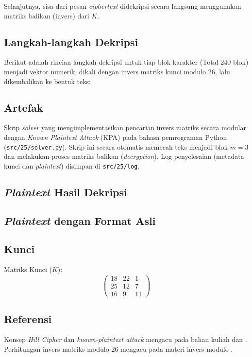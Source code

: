 Selanjutnya, sisa dari pesan \textit{ciphertext} didekripsi secara langsung menggunakan matriks balikan (invers) dari $K$.

\subsection*{Langkah-langkah Dekripsi}

Berikut adalah rincian langkah dekripsi untuk tiap blok karakter (Total 240 blok) menjadi vektor numerik, dikali dengan invers matriks kunci modulo 26, lalu dikembalikan ke bentuk teks:



\subsection*{Artefak}

Skrip \textit{solver} yang mengimplementasikan pencarian invers matriks secara modular dengan \textit{Known Plaintext Attack} (KPA) pada bahasa pemrograman Python (\texttt{src/25/solver.py}). Skrip ini secara otomatis memecah teks menjadi blok $m=3$ dan melakukan proses matriks balikan (\textit{decryption}). Log penyelesaian (metadata kunci dan \textit{plaintext}) disimpan di \texttt{src/25/log}.

\subsection*{\textit{Plaintext} Hasil Dekripsi}


\subsection*{\textit{Plaintext} dengan Format Asli}



\subsection*{Kunci}

Matriks Kunci ($K$):
\begin{equation*}
\begin{pmatrix} 18 & 22 & 1 \\ 25 & 12 & 7 \\ 16 & 9 & 11 \end{pmatrix}
\end{equation*}

\subsection*{Referensi}

Konsep \textit{Hill Cipher} dan \textit{known-plaintext attack} mengacu pada bahan kuliah \cite{munir-klasik2}
dan \cite{hill-gfg}. Perhitungan invers matriks modulo 26 mengacu pada materi invers modulo \cite{munir-matematika}.
